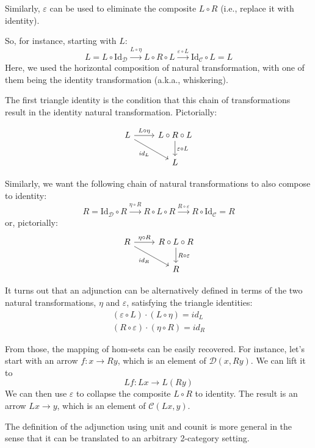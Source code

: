 \documentclass[DaoFP]{subfiles}
\begin{document}
Similarly, $\varepsilon$ can be used to eliminate the composite $L \circ R$ (i.e., replace it with identity). 

So, for instance, starting with $L$:
\[ L = L \circ \text{Id}_{\mathcal{D}} \xrightarrow{L \circ \eta} L \circ R \circ L \xrightarrow{\varepsilon \circ L} \text{Id}_{\mathcal{C}} \circ L = L \]
Here, we used the horizontal composition of natural transformation, with one of them being the identity transformation (a.k.a., whiskering).

The first triangle identity is the condition that this chain of transformations result in the identity natural transformation. Pictorially:

\[
 \begin{tikzcd}
 L
 \arrow[r, "L \circ \eta"]
 \arrow[rd, "id_L"']
 & L \circ R \circ L
 \arrow[d, "\varepsilon \circ L"]
 \\
 & L
  \end{tikzcd}
\]

Similarly, we want the following chain of natural transformations to also compose to identity:
\[ R = \text{Id}_{\mathcal{D}} \circ R \xrightarrow{\eta \circ R} R \circ L \circ R \xrightarrow{R \circ \varepsilon} R \circ \text{Id}_{\mathcal{C}} = R \]
or, pictorially:
\[
 \begin{tikzcd}
 R
 \arrow[r, "\eta \circ R"]
 \arrow[rd, "id_R"']
 & R \circ L \circ R
 \arrow[d, "R \circ \varepsilon"]
 \\
 & R
  \end{tikzcd}
\]

It turns out that an adjunction can be alternatively defined in terms of the two natural transformations, $\eta$ and $\varepsilon$, satisfying the  triangle identities:
\begin{align*}
(\varepsilon \circ L) \cdot (L \circ \eta) = id_L \\
(R \circ \varepsilon) \cdot (\eta \circ R) = id_R
\end{align*}

From those, the mapping of hom-sets can be easily recovered. For instance, let's start with an arrow $f \colon x \to R y$, which is an element of $\mathcal{D}( x , R y)$. We can lift it to 
\[L f \colon L x \to L (R y)\]
We can then use $\varepsilon$ to collapse the composite $L \circ R$ to identity. The result is an arrow $L x \to y$, which is an element of $ \mathcal{C} (L x, y)$.


The definition of the adjunction using unit and counit is more general in the sense that it can be translated to an arbitrary 2-category setting. 
\end{document}

